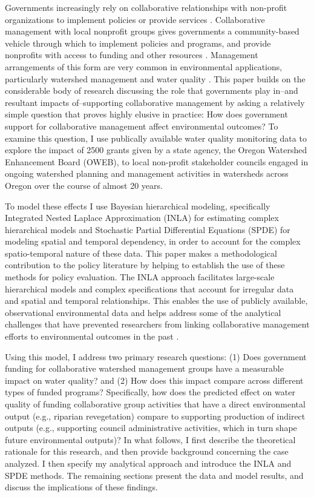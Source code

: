 \documentclass[11pt,a4paper,titlepage]{article}
\begin{document}
Governments increasingly rely on collaborative relationships with non-profit organizations to implement policies or provide services \parencite{salamon2002}. Collaborative management with local nonprofit groups gives governments a community-based vehicle through which to implement policies and programs, and provide nonprofits with access to funding and other resources \parencite{nikolic2008}. Management arrangements of this form are very common in environmental applications, particularly watershed management and water quality \parencite[e.g.,][]{leach2013,leach2002,margerum2011,hardy2008}. This paper builds on the considerable body of research discussing the role that governments play in--and resultant impacts of--supporting collaborative management \parencite[e.g.,][]{nikolic2008,lubell2008,ansell2008,emerson2012,scott2014} by asking a relatively simple question that proves highly elusive in practice: How does government support for collaborative management affect environmental outcomes? To examine this question, I use publically available water quality monitoring data to explore the impact of 2500 grants given by a state agency, the Oregon Watershed Enhancement Board (OWEB), to local non-profit stakeholder councils engaged in ongoing watershed planning and management activities in watersheds across Oregon over the course of almost 20 years.

To model these effects I use Bayesian hierarchical modeling, specifically Integrated Nested Laplace Approximation (INLA) \parencite{rue2009} for estimating complex hierarchical models and Stochastic Partial Differential Equations (SPDE) \parencite{lindgren2011} for modeling spatial and temporal dependency, in order to account for the complex spatio-temporal nature of these data. This paper makes a methodological contribution to the policy literature by helping to establish the use of these methods for policy evaluation. The INLA approach facilitates large-scale hierarchical models and complex specifications that account for irregular data and spatial and temporal relationships. This enables the use of publicly available, observational environmental data and helps address some of the analytical challenges that have prevented researchers from linking collaborative management efforts to environmental outcomes in the past \parencite{koontz2006,thomas2011}.

Using this model, I address two primary research questions: (1) Does government funding for collaborative watershed management groups have a measurable impact on water quality? and (2) How does this impact compare across different types of funded programs? Specifically, how does the predicted effect on water quality of funding collaborative group activities that have a direct environmental output (e.g., riparian revegetation) compare to supporting production of indirect outputs (e.g., supporting council administrative activities, which in turn shape future environmental outputs)? In what follows, I first describe the theoretical rationale for this research, and then provide background concerning the case analyzed. I then specify my analytical approach and introduce the INLA and SPDE methods. The remaining sections present the data and model results, and discuss the implications of these findings.
\end{document}
